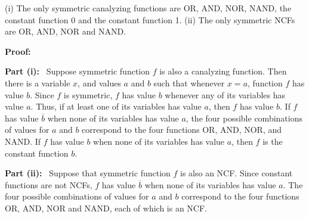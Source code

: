 \begin{proposition}\label{pro:ncf_symmetric}
(i) The only symmetric canalyzing functions are OR, AND, NOR, NAND, 
the constant function 0 and the constant function 1.
(ii) The only symmetric NCFs are OR, AND, NOR and NAND.
\end{proposition}
\noindent
\textbf{Proof:}~

\smallskip

\noindent
\textbf{Part (i):}~
Suppose symmetric function $f$ is also a canalyzing function. 
Then there is a variable $x$, and values $a$ and $b$ 
such that whenever $x = a$, function $f$ has value $b$.  
Since $f$ is symmetric, $f$  has
value $b$ whenever any of its variables has value $a$.  
Thus, if at least one of its variables has value $a$, then $f$ has value $b$.  
If $f$ has value $\overline{b}$ when none of its variables has
value $a$, the four possible combinations of values for $a$ and $b$
correspond to the four functions OR, AND, NOR, and NAND.  If $f$
has value $b$ when none of its variables has value $a$, then $f$
is the constant function $b$.

\smallskip

\noindent
\textbf{Part (ii):}~
Suppose that symmetric function $f$ is also an NCF.  
Since constant functions are not NCFs,
$f$ has value $\overline{b}$ when none of its variables has value $a$.
The four possible combinations of values for $a$ and $b$ correspond
to the four functions OR, AND, NOR and NAND, each of which is an
NCF.  \QED








